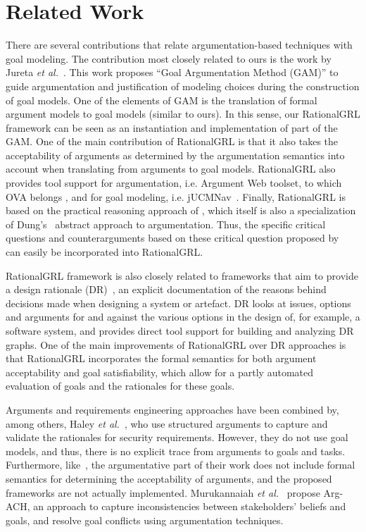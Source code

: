 \documentclass[11.5pt,two column]{llncs}
\begin{document}
\section{Related Work}
\label{sect:relatedwork}

There are several contributions that relate argumentation-based techniques with goal modeling. The contribution most closely related to ours is the work by Jureta \emph{et al.}~\cite{Jureta:RE2008}. This work proposes ``Goal Argumentation Method (GAM)'' to guide argumentation and justification of modeling choices during the construction of goal models. One of the elements of GAM is the translation of formal argument models to goal models (similar to ours). In this sense, our \textsf{RationalGRL} framework can be seen as an instantiation and implementation of  part of the GAM. One of the main contribution of \textsf{RationalGRL} is that it also takes the acceptability of arguments as determined by the argumentation semantics \cite{Dung1995} into account when translating from arguments to goal models.  \textsf{RationalGRL} also provides tool support for argumentation, i.e. Argument Web toolset, to which OVA belongs \cite{bex2013implementing}, and for goal modeling, i.e. jUCMNav~\cite{jUCMNav}. Finally, \textsf{RationalGRL} is based on the practical reasoning approach of \cite{Atkinson2014}, which itself is also a specialization of Dung's~\cite{Dung1995} abstract approach to argumentation. Thus, the specific critical questions and counterarguments based on these critical question proposed by~\cite{Atkinson2014} can easily be incorporated into \textsf{RationalGRL}. 

\textsf{RationalGRL} framework is also closely related to frameworks that aim to provide a design rationale (DR)~\cite{shum2006hypermedia}, an explicit documentation of the reasons behind decisions made when designing a system or artefact. DR looks at issues, options and arguments for and against the various options in the design of, for example, a software system, and provides direct tool support for building and analyzing DR graphs. One of the main improvements of \textsf{RationalGRL} over DR approaches is that \textsf{RationalGRL} incorporates the formal semantics for both argument acceptability and goal satisfiability, which allow for a partly automated evaluation of goals and the rationales for these goals. 

Arguments and requirements engineering approaches have been combined by, among others, Haley \emph{et al.}~\cite{haley2005arguing}, who use structured arguments to capture and validate the rationales for security requirements. However, they do not use goal models, and thus, there is no explicit trace from arguments to goals and tasks. Furthermore, like~\cite{Jureta:RE2008}, the argumentative part of their work does not include formal semantics for determining the acceptability of arguments, and the proposed frameworks are not actually implemented. Murukannaiah \emph{et al.}~\cite{murukannaiah2015resolving} propose Arg-ACH, an approach to capture inconsistencies between stakeholders' beliefs and goals, and resolve goal conflicts using argumentation techniques.
\end{document}
